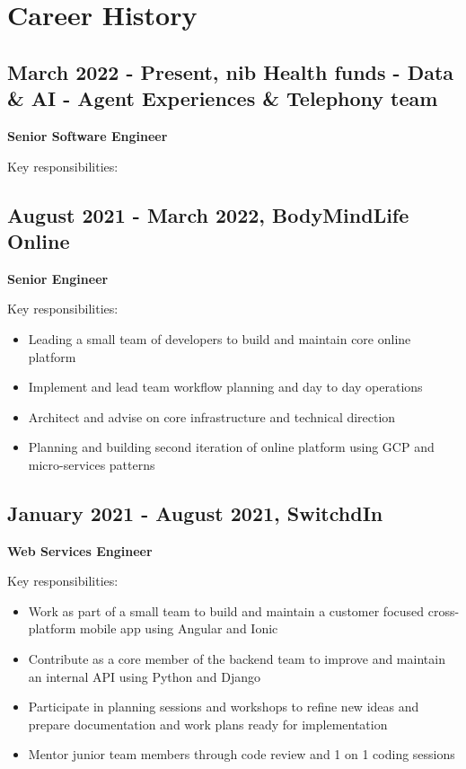 \documentclass[11pt]{article}
\begin{document}
\section*{Career History}
\label{sec:orge7bb440}

\subsection*{March 2022 - Present, nib Health funds - Data \& AI - Agent Experiences \& Telephony team}
\label{sec:orgbee549f}

\textbf{Senior Software Engineer}

Key responsibilities:
\subsection*{August 2021 - March 2022, BodyMindLife Online}
\label{sec:orgb4942b5}

\textbf{Senior Engineer}

Key responsibilities:

\begin{itemize}
\item Leading a small team of developers to build and maintain core online platform
\item Implement and lead team workflow planning and day to day operations
\item Architect and advise on core infrastructure and technical direction
\item Planning and building second iteration of online platform using GCP and micro-services patterns
\end{itemize}
\subsection*{January 2021 - August 2021, SwitchdIn}
\label{sec:org86c907e}

\textbf{Web Services Engineer}

Key responsibilities:

\begin{itemize}
\item Work as part of a small team to build and maintain a customer focused cross-platform mobile app using Angular and Ionic
\item Contribute as a core member of the backend team to improve and maintain an internal API using Python and Django
\item Participate in planning sessions and workshops to refine new ideas and prepare documentation and work plans ready for implementation
\item Mentor junior team members through code review and 1 on 1 coding sessions
\end{itemize}
\end{document}
